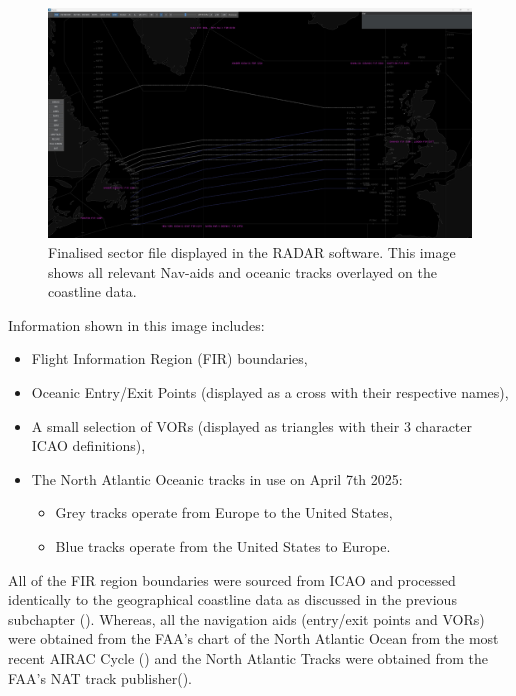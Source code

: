 \documentclass[stu, a4paper, 12pt, floatsintext]{apa7}
\numberwithin{figure}{section}
\numberwithin{table}{section}
\numberwithin{equation}{section}
\begin{document}
\begin{figure}[H]
    \caption{Finalised sector file displayed in the RADAR software. This image shows all relevant Nav-aids and oceanic tracks overlayed on the coastline data.}
    \label{fig:2.7}
    \centering
    \includegraphics[width=1.1\textwidth]{pictures/Figure 2.7 FYP.jpg}    
\end{figure}

Information shown in this image includes:
\begin{itemize}
    \item Flight Information Region (FIR) boundaries, 
    \item Oceanic Entry/Exit Points (displayed as a cross with their respective names), 
    \item A small selection of VORs (displayed as triangles with their 3 character ICAO definitions),
    \item The North Atlantic Oceanic tracks in use on April 7th 2025:
    \begin{itemize}
        \item Grey tracks operate from Europe to the United States, 
        \item Blue tracks operate from the United States to Europe.
    \end{itemize}
\end{itemize}

All of the FIR region boundaries were sourced from ICAO and processed identically to the geographical coastline data as discussed in the previous subchapter (\cite{ICAO_FIR}). Whereas, all the navigation aids (entry/exit points and VORs) were obtained from the FAA’s chart of the North Atlantic Ocean from the most recent AIRAC Cycle (\cite{FAA_DEC}) and the North Atlantic Tracks were obtained from the FAA’s NAT track publisher(\cite{FAA_NAT}). 
\end{document}
